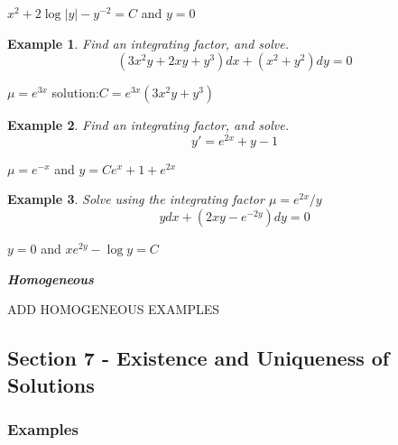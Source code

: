 \documentclass[14pt]{article}
\newtheorem{ex}{Example}
\newcommand{\type}[1]{\begin{center} \emph{\textbf{#1}} \end{center}}
\newcommand{\exs}{\subsubsection*{Examples}}
\begin{document}
$x^2 + 2 \log |y | - y^{-2} = C $ and $y = 0$

\begin{ex}Find an integrating factor, and solve.
\[(3x^2 y + 2 x y + y^3)dx + (x^2 + y^2) dy =0\]
\end{ex}

$\mu = e^{3x}$ solution:$C=e^{3x}(3x^2 y + y^3)$


\begin{ex}Find an integrating factor, and solve.
\[y' = e^{2x} +y -1\]
\end{ex}

$\mu = e^{-x} $ and $y = C e^x + 1 + e ^{2x}$

\begin{ex}Solve using the integrating factor $\mu = e^{2x} / y$
\[y dx + (2 x y - e^{-2y}) dy = 0\]
\end{ex}

$y=0$ and $x e^{2 y} - \log y = C$

\type{Homogeneous}
ADD HOMOGENEOUS EXAMPLES

\subsection{Section 7 - Existence and Uniqueness of Solutions}


\exs
\end{document}
